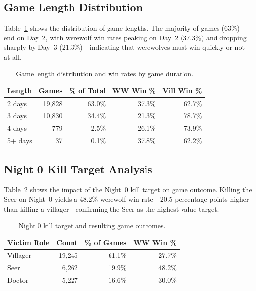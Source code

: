 \subsection{Game Length Distribution}
\label{app:game_length}

Table~\ref{tab:game_length} shows the distribution of game lengths. The majority of games (63\%) end on Day~2, with werewolf win rates peaking on Day~2 (37.3\%) and dropping sharply by Day~3 (21.3\%)---indicating that werewolves must win quickly or not at all.

\begin{table}[ht]
\caption{Game length distribution and win rates by game duration.}
\label{tab:game_length}
\centering
\small
\begin{tabular}{lrrrr}
\toprule
\textbf{Length} & \textbf{Games} & \textbf{\% of Total} & \textbf{WW Win \%} & \textbf{Vill Win \%} \\
\midrule
2 days & 19,828 & 63.0\% & 37.3\% & 62.7\% \\
3 days & 10,830 & 34.4\% & 21.3\% & 78.7\% \\
4 days &    779 &  2.5\% & 26.1\% & 73.9\% \\
5+ days &    37 &  0.1\% & 37.8\% & 62.2\% \\
\bottomrule
\end{tabular}
\end{table}


\subsection{Night 0 Kill Target Analysis}
\label{app:night0}

Table~\ref{tab:night0} shows the impact of the Night~0 kill target on game outcome. Killing the Seer on Night~0 yields a 48.2\% werewolf win rate---20.5 percentage points higher than killing a villager---confirming the Seer as the highest-value target.

\begin{table}[ht]
\caption{Night 0 kill target and resulting game outcomes.}
\label{tab:night0}
\centering
\small
\begin{tabular}{lrrr}
\toprule
\textbf{Victim Role} & \textbf{Count} & \textbf{\% of Games} & \textbf{WW Win \%} \\
\midrule
Villager & 19,245 & 61.1\% & 27.7\% \\
Seer     &  6,262 & 19.9\% & 48.2\% \\
Doctor   &  5,227 & 16.6\% & 30.0\% \\
\bottomrule
\end{tabular}
\end{table}


